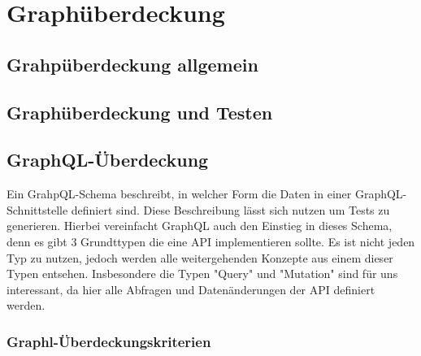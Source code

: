 \section*{Graphüberdeckung}

\subsection*{Grahpüberdeckung allgemein}

\subsection*{Graphüberdeckung und Testen}

\subsection*{GraphQL-Überdeckung}

Ein GrahpQL-Schema beschreibt, in welcher Form die Daten in einer GraphQL-Schnittstelle definiert sind.
Diese Beschreibung lässt sich nutzen um Tests zu generieren.
Hierbei vereinfacht GraphQL auch den Einstieg in dieses Schema, denn es gibt 3 Grundttypen die eine
API implementieren sollte. Es ist nicht jeden Typ zu nutzen, jedoch werden alle weitergehenden Konzepte aus
einem dieser Typen entsehen. Insbesondere die Typen "Query" und "Mutation" sind für uns interessant, da hier alle Abfragen und
Datenänderungen der API definiert werden.



\subsubsection*{Graphl-Überdeckungskriterien}
